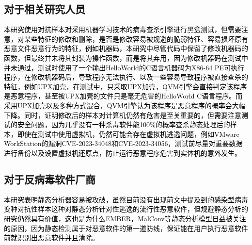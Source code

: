\subsection{对于相关研究人员}

\textcolor{black}{本研究使用对抗样本对采用机器学习技术的病毒查杀引擎进行黑盒测试，但需要注意，对某些特征的修改和删除，是否是修改容易被规避的脆弱特征、容易损坏原有恶意文件恶意行为的特征，例如机器码，本研究中尽管代码中保留了修改机器码的函数，但最终并未将其封装为操作函数，而是将其弃用，因为修改机器码在测试中并未通过，测试时使用了一个输出HelloWorld的C语言机器码为X86-64 PE可执行程序，在修改机器码后，导致程序无法执行、以及一些容易导致程序被直接查杀的特征，例如UPX加壳，在测试中，只采取UPX加壳，QVM引擎会直接判定该程序是恶意程序，甚至被UPX加壳的文件只是毫无危害的HelloWorld C语言程序。而采用UPX加壳以及多种方式混合，QVM引擎认为该程序是恶意程序的概率会大幅下降。同时，证明修改后的样本对计算机仍然有危害是至关重要的，但需要注意测试的安全问题，因为几乎没有一种杀毒软件能100\%的概率查杀静态处理后的样本，即使在测试中使用虚拟机，仍然可能会存在虚拟机逃逸问题，例如VMware WorkStation的漏洞CVE-2023-34048和CVE-2023-34056，测试前尽量对重要数据进行备份以及设置虚拟机还原点，防止运行恶意程序危害到实体机的意外发生。}

\subsection{对于反病毒软件厂商}

\textcolor{black}{本研究表明静态分析器容易被攻破，虽然目前没有出现前文中提及到的感染型病毒变种对抗性样本这种对静态分析针对性逃逸的流行性恶意软件，但规避静态分析的研究仍然具有价值，这也是为什么EMBER，MalConv等静态分析模型日益被关注的原因\cite{ref15}，因为静态检测属于对恶意软件的第一道防线，保证能在用户执行恶意软件前就识别出恶意软件并且清除。}


